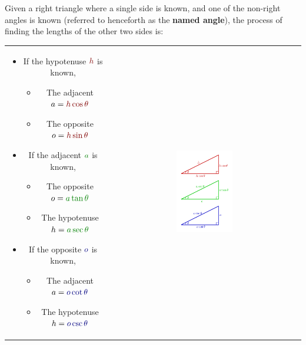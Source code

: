 \documentclass{article}
\newcommand{\dr}[1]{\textcolor{dark_red}{#1}}
\newcommand{\dg}[1]{\textcolor{dark_green}{#1}}
\newcommand{\db}[1]{\textcolor{dark_blue}{#1}}
\begin{document}
Given a right triangle where a single side is known, and one of the non-right angles is known (referred to henceforth as the {\bf named angle}), the process of finding the lengths of the other two sides is: 

\begin{tabular}{cc}
\parbox{0.5\textwidth}{
\begin{itemize}
\item If the hypotenuse \(\dr{h}\) is known, 
	\begin{itemize}
	\item The adjacent \(a = \dr{h\cos\theta}\)
	\item The opposite \(o = \dr{h\sin\theta}\)
	\end{itemize}
\item If the adjacent \(\dg{a}\) is known, 
	\begin{itemize}
	\item The opposite \(o = \dg{a\tan\theta}\)
	\item The hypotenuse \(h = \dg{a\sec\theta}\)
	\end{itemize}
\item If the opposite \(\db{o}\) is known, 
	\begin{itemize}
	\item The adjacent \(a = \db{o\cot\theta}\)
	\item The hypotenuse \(h = \db{o\csc\theta}\)
	\end{itemize}
\end{itemize}
} & \parbox{0.3\textwidth}{
\includegraphics[width = 0.3\textwidth]{3_triangles_non_unit}
}
\end{tabular}
\end{document}
